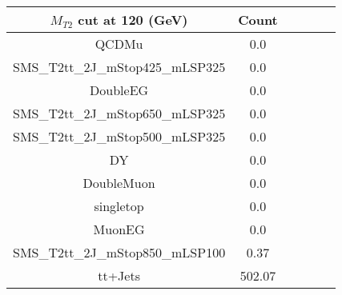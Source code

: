 \documentclass[8pt]{article}
\begin{document}
\begin{tabular}{|c|c|c|c|c|c|}
\hline
$M_{T2}$ cut at 120 (GeV) & Count \\
\hline
\hline
QCDMu & 0.0\\
SMS\_T2tt\_2J\_mStop425\_mLSP325 & 0.0\\
DoubleEG & 0.0\\
SMS\_T2tt\_2J\_mStop650\_mLSP325 & 0.0\\
SMS\_T2tt\_2J\_mStop500\_mLSP325 & 0.0\\
DY & 0.0\\
DoubleMuon & 0.0\\
singletop & 0.0\\
MuonEG & 0.0\\
SMS\_T2tt\_2J\_mStop850\_mLSP100 & 0.37\\
tt+Jets & 502.07\\
\hline
\hline
\end{tabular}
\end{document}
